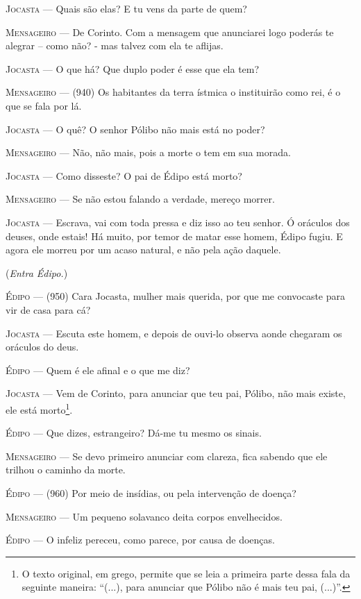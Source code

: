 \textsc{Jocasta} --- Quais são elas? E tu vens da parte de quem?

\textsc{Mensageiro} --- De Corinto. Com a mensagem que anunciarei logo poderás te alegrar --
como não? - mas talvez com ela te aflijas.

\textsc{Jocasta} --- O que há? Que duplo poder é esse que ela tem?

\textsc{Mensageiro} --- (940) Os habitantes da terra ístmica o instituirão como rei, é o que se
fala por lá.

\textsc{Jocasta} --- O quê? O senhor Pólibo não mais está no poder?

\textsc{Mensageiro} --- Não, não mais, pois a morte o tem em sua morada.

\textsc{Jocasta} --- Como disseste? O pai de Édipo está morto?

\textsc{Mensageiro} --- Se não estou falando a verdade, mereço morrer.

\textsc{Jocasta} --- Escrava, vai com toda pressa e diz isso ao teu senhor. Ó oráculos dos
deuses, onde estais! Há muito, por temor de matar esse homem, Édipo
fugiu. E agora ele morreu por um acaso natural, e não pela ação daquele.

(\emph{Entra Édipo.})

\textsc{Édipo} --- (950) Cara Jocasta, mulher mais querida, por que me convocaste para vir
de casa para cá?

\textsc{Jocasta} --- Escuta este homem, e depois de ouvi-lo observa aonde chegaram os
oráculos do deus.

\textsc{Édipo} --- Quem é ele afinal e o que me diz?

\textsc{Jocasta} --- Vem de Corinto, para anunciar que teu pai, Pólibo, não mais existe, ele
está morto\footnote{O texto original, em grego, permite que se leia a
  primeira parte dessa fala da seguinte maneira: ``(...), para anunciar
  que Pólibo não é mais teu pai, (...)''.}.

\textsc{Édipo} --- Que dizes, estrangeiro? Dá-me tu mesmo os sinais.

\textsc{Mensageiro} --- Se devo primeiro anunciar com clareza, fica sabendo que ele trilhou o
caminho da morte.

\textsc{Édipo} --- (960) Por meio de insídias, ou pela intervenção de doença?

\textsc{Mensageiro} --- Um pequeno solavanco deita corpos envelhecidos.

\textsc{Édipo} --- O infeliz pereceu, como parece, por causa de doenças.

